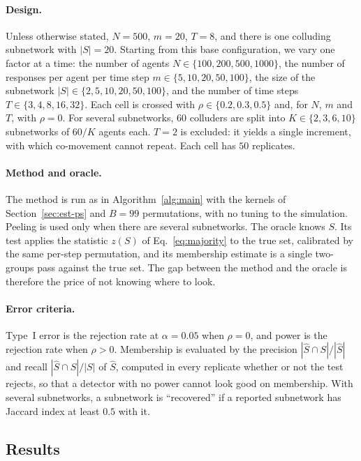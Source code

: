 \documentclass{article}
\theoremstyle{plain}
\theoremstyle{definition}
\begin{document}
\paragraph{Design.} Unless otherwise stated, $N=500$, $m=20$, $T=8$, and there is one colluding subnetwork with $|S|=20$. Starting from this base configuration, we vary one factor at a time: the number of agents $N\in\{100,200,500,1000\}$, the number of responses per agent per time step $m\in\{5,10,20,50,100\}$, the size of the subnetwork $|S|\in\{2,5,10,20,50,100\}$, and the number of time steps $T\in\{3,4,8,16,32\}$. Each cell is crossed with $\rho\in\{0.2,0.3,0.5\}$ and, for $N$, $m$ and $T$, with $\rho=0$. For several subnetworks, $60$ colluders are split into $K\in\{2,3,6,10\}$ subnetworks of $60/K$ agents each. $T=2$ is excluded: it yields a single increment, with which co-movement cannot repeat. Each cell has $50$ replicates.

\paragraph{Method and oracle.} The method is run as in Algorithm~\ref{alg:main} with the kernels of Section~\ref{sec:est-ps} and $B=99$ permutations, with no tuning to the simulation. Peeling is used only when there are several subnetworks. The oracle knows $S$. Its test applies the statistic $z(S)$ of Eq.~\eqref{eq:majority} to the true set, calibrated by the same per-step permutation, and its membership estimate is a single two-groups pass against the true set. The gap between the method and the oracle is therefore the price of not knowing where to look.

\paragraph{Error criteria.} Type~I error is the rejection rate at $\alpha=0.05$ when $\rho=0$, and power is the rejection rate when $\rho>0$. Membership is evaluated by the precision $|\hat S\cap S|/|\hat S|$ and recall $|\hat S\cap S|/|S|$ of $\hat S$, computed in every replicate whether or not the test rejects, so that a detector with no power cannot look good on membership. With several subnetworks, a subnetwork is ``recovered'' if a reported subnetwork has Jaccard index at least $0.5$ with it.

\subsection{Results}
\label{sec:sim-results}
\end{document}
